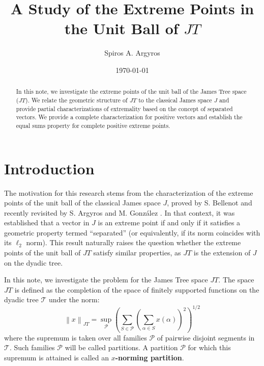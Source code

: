 \documentclass[11pt,a4paper]{amsart}
\newcommand{\JT}{JT}
\newcommand{\Tree}{\mathcal{T}}
\newcommand{\norm}[1]{\left\lVert#1\right\rVert}
\newcommand{\J}{J}
\begin{document}
\title{A Study of the Extreme Points in the Unit Ball of $\JT$}
\author[Spiros A. Argyros]{Spiros A. Argyros}
\address{National Technical University of Athens, Faculty of Applied Sciences, 
Department of Mathematics, Zografou Campus, 157 80, Athens, Greece.}
\date{\today}

\begin{abstract}
In this note, we investigate the extreme points of the unit ball of the James Tree space ($\JT$). We relate the geometric structure of $\JT$ to the classical James space $\J$ and provide partial characterizations of extremality based on the concept of separated vectors. We provide a complete characterization for positive vectors and establish the equal sums property for complete positive extreme points.
\end{abstract}

\makeatletter
{}
\makeatother
{}




\maketitle

\section{Introduction}

The motivation for this research stems from the characterization of the extreme points of the unit ball of the classical James space $\J$, proved by S. Bellenot \cite{B} and recently revisited by S. Argyros and M. González \cite{AG2025}. In that context, it was established that a vector in $\J$ is an extreme point if and only if it satisfies a geometric property termed ``separated'' (or equivalently, if its norm coincides with its $\ell_2$ norm). This result naturally raises the question whether the extreme points of the unit ball of $\JT$ satisfy similar properties, as $\JT$ is the extension of $\J$ on the dyadic tree. 

In this note, we investigate the problem for the James Tree space $\JT$. The space $\JT$ is defined as the completion of the space of finitely supported functions on the dyadic tree $\Tree$ under the norm:
\[ \norm{x}_{\JT} = \sup_{\mathcal{P}} \left( \sum_{S \in \mathcal{P}} \left( \sum_{\alpha \in S} x(\alpha) \right)^2 \right)^{1/2} \]
where the supremum is taken over all families $\mathcal{P}$ of pairwise disjoint segments in $\Tree$. Such families $\mathcal{P}$ will be called partitions. A partition $\mathcal{P}$ for which this supremum is attained is called an \textbf{$x$-norming partition}.
\end{document}

